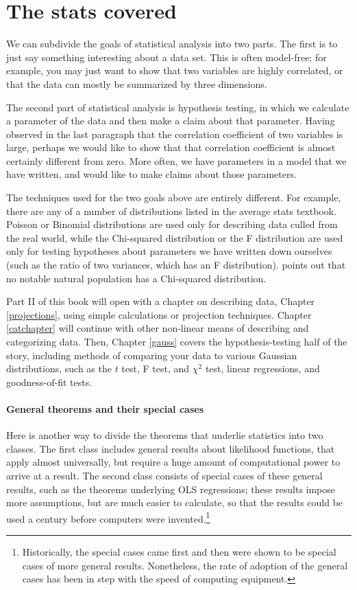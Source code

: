 \section{The stats covered} 
We can subdivide the goals of statistical analysis into two parts. The
first is to just say something interesting about a data set. This is often
model-free; for example, you may just want to show that two variables
are highly correlated, or that the data can mostly be summarized by three
dimensions.

The second part of statistical analysis is hypothesis testing, in which
we calculate a parameter of the data and then make a claim about that
parameter.  Having observed in the last paragraph that the correlation
coefficient of two variables is large, perhaps we would like to show
that that correlation coefficient is almost certainly different from
zero. More often, we have parameters in a model that we have written,
and would like to make claims about those parameters.

The techniques used for the two goals above are entirely different. For
example, there are any of a number of distributions listed in the
average stats textbook.  Poisson or Binomial distributions are used
only for describing data culled from the real world, while the Chi-squared
distribution or the F distribution are used only for testing hypotheses
about parameters we have written down ourselves (such as the ratio of
two variances, which has an F distribution). \citet[p 141]{kmenta} points out
that no notable natural population has a Chi-squared distribution.

Part II of this book will open with a chapter on describing data,
Chapter \ref{projections}, using simple calculations or projection
techniques. Chapter \ref{catchapter} will continue with other non-linear
means of describing and categorizing data. Then, Chapter \ref{gauss}
covers the hypothesis-testing half of the story, including methods of
comparing your data to various Gaussian distributions, such as the $t$
test, F test, and $\chi^2$ test, linear regressions, and goodness-of-fit
tests.



\paragraph{General theorems and their special cases}
Here is another way to divide the theorems that underlie
statistics into two classes. The first class includes general
results about likelihood functions, that 
apply almost universally, but require a huge
amount of computational power to arrive at a result. The second class
consists of special cases of these general results, such as the theorems
underlying OLS regressions; these results impose more
assumptions, but are much easier to calculate, so that the results could
be used a century before computers were invented.\footnote{Historically,
the special cases came first and then were shown to be special cases of
more general results. Nonetheless, the rate of adoption of the general
cases has been in step with the speed of computing equipment.}


